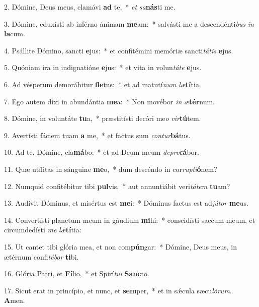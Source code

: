 2. Dómine, Deus meus, clamávi \textbf{ad} te,~*  \textit{et} \textit{sa}\textbf{nás}ti me.\

3. Dómine, eduxísti ab inférno ánimam \textbf{me}am:~*  salvásti me a descendénti\textit{bus} \textit{in} \textbf{la}cum.\

4. Psállite Dómino, sancti \textbf{e}jus:~*  et confitémini memóriæ sancti\textit{tá}\textit{tis} \textbf{e}jus.\

5. Quóniam ira in indignatióne \textbf{e}jus:~*  et vita in volun\textit{tá}\textit{te} \textbf{e}jus.\

6. Ad vésperum demorábitur \textbf{fle}tus:~*  et ad matutí\textit{num} \textit{læ}\textbf{tí}tia.\

7. Ego autem dixi in abundántia \textbf{me}a:~*  Non movébor \textit{in} \textit{æ}\textbf{tér}num.\

8. Dómine, in voluntáte \textbf{tu}a,~*  præstitísti decóri me\textit{o} \textit{vir}\textbf{tú}tem.\

9. Avertísti fáciem tuam \textbf{a} me,~*  et factus sum \textit{con}\textit{tur}\textbf{bá}tus.\

10. Ad te, Dómine, cla\textbf{má}bo:~*  et ad Deum meum \textit{de}\textit{pre}\textbf{cá}bor.\

11. Quæ utílitas in sánguine \textbf{me}o,~*  dum descéndo in cor\textit{rup}\textit{ti}\textbf{ó}nem?\

12. Numquid confitébitur tibi \textbf{pul}vis,~*  aut annuntiábit veri\textit{tá}\textit{tem} \textbf{tu}am?\

13. Audívit Dóminus, et misértus est \textbf{me}i:~*  Dóminus factus est ad\textit{jú}\textit{tor} \textbf{me}us.\

14. Convertísti planctum meum in gáudium \textbf{mi}hi:~*  conscidísti saccum meum, et circumdedísti \textit{me} \textit{læ}\textbf{tí}tia:\

15. Ut cantet tibi glória mea, et non com\textbf{pún}gar:~*  Dómine, Deus meus, in ætérnum confi\textit{té}\textit{bor} \textbf{ti}bi.\

16. Glória Patri, et \textbf{Fí}lio,~*  et Spirí\textit{tu}\textit{i} \textbf{Sanc}to.\

17. Sicut erat in princípio, et nunc, et \textbf{sem}per,~*  et in sǽcula sæcu\textit{ló}\textit{rum}. \textbf{A}men.\

